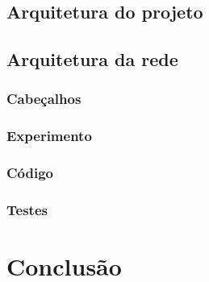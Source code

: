 \documentclass[12pt,
openright, 
oneside,
a4paper,
brazil]{facom-ufu-abntex2}
\begin{document}
\subsection{Arquitetura do projeto}
\subsection{Arquitetura da rede}
\subsubsection{Cabeçalhos}
\subsubsection{Experimento}
\subsubsection{Código}
\subsubsection{Testes}

\section{Conclusão}
\end{document}
